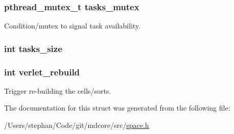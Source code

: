 \hypertarget{structspace_a733e78f89bc6e3cd82d2248ae5c38992}{
\subsubsection[{tasks\-\_\-mutex}]{\setlength{\rightskip}{0pt plus 5cm}pthread\-\_\-mutex\-\_\-t tasks\-\_\-mutex}}\label{structspace_a733e78f89bc6e3cd82d2248ae5c38992}
Condition/mutex to signal task availability. \hypertarget{structspace_a51ba14384309b40c30d6a908b8caab5d}{
\subsubsection[{tasks\-\_\-size}]{\setlength{\rightskip}{0pt plus 5cm}int tasks\-\_\-size}}\label{structspace_a51ba14384309b40c30d6a908b8caab5d}
\hypertarget{structspace_a767fceff621253e5a779078970a5973b}{
\subsubsection[{verlet\-\_\-rebuild}]{\setlength{\rightskip}{0pt plus 5cm}int verlet\-\_\-rebuild}}\label{structspace_a767fceff621253e5a779078970a5973b}
Trigger re-\/building the cells/sorts. 

The documentation for this struct was generated from the following file\-:\begin{DoxyCompactItemize}
\item 
/\-Users/stephan/\-Code/git/mdcore/src/\hyperlink{space_8h}{space.\-h}\end{DoxyCompactItemize}

